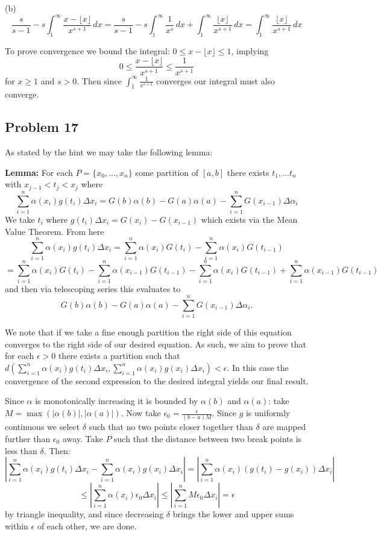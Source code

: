 \documentclass{amsart}
\begin{document}
(b) \[\frac{s}{s-1}-s\int_1^\infty \frac{x-\lfloor x\rfloor}{x^{s+1}}\,dx=\frac{s}{s-1}-s\int_1^\infty\frac{1}{x^s}\,dx+\int_1^\infty\frac{\lfloor x \rfloor}{x^{s+1}}\,dx=\int_1^\infty\frac{\lfloor x \rfloor}{x^{s+1}}\,dx\]

To prove convergence we bound the integral: $0\leq x-\lfloor x\rfloor\leq 1$, implying \[0\leq\frac{x-\lfloor x\rfloor}{x^{s+1}}\leq \frac{1}{x^{s+1}}\] for $x\geq 1$ and $s>0$. Then since $\int_1^\infty \frac{1}{x^{s+1}}$ converges our integral must also converge.

\subsection*{Problem 17}
As stated by the hint we may take the following lemma:

\medskip \noindent \textbf{Lemma:} For each $P=\{x_0,\dots,x_n\}$ some partition of $[a,b]$ there exists $t_1,\dots t_n$ with $x_{j-1}<t_j<x_j$ where \[\sum_{i=1}^n\alpha(x_i)g(t_i)\Delta x_i=G(b)\alpha(b)-G(a)\alpha(a)-\sum_{i=1}^nG(x_{i-1})\Delta \alpha_i\]
We take $t_i$ where $g(t_i)\Delta x_i = G(x_i)-G(x_{i-1})$ which exists via the Mean Value Theorem. From here \[\sum_{i=1}^n\alpha(x_i)g(t_i)\Delta x_i= \sum_{i=1}^n\alpha(x_i)G(t_i)- \sum_{i=1}^n\alpha(x_i)G(t_{i-1})\]
\[= \sum_{i=1}^n\alpha(x_i)G(t_i)-  \sum_{i=1}^n\alpha(x_{i-1})G(t_{i-1})-\sum_{i=1}^n\alpha(x_i)G(t_{i-1})+ \sum_{i=1}^n\alpha(x_{i-1})G(t_{i-1})\]
and then via telescoping series this evaluates to 
\[G(b)\alpha(b)-G(a)\alpha(a)-\sum_{i=1}^nG(x_{i-1})\Delta \alpha_i.\]

\medskip \noindent We note that if we take a fine enough partition the right side of this equation converges to the right side of our desired equation. As such, we aim to prove that for each $\epsilon>0$ there exists a partition such that $d(\sum_{i=1}^n\alpha(x_i)g(t_i)\Delta x_i,\sum_{i=1}^n\alpha(x_i)g(x_i)\Delta x_i) < \epsilon$. In this case the convergence of the second expression to the desired integral yields our final result.

\medskip \noindent Since $\alpha$ is monotonically increasing it is bounded by $\alpha(b)$ and $\alpha(a)$: take $M=\max(|\alpha(b)|,|\alpha(a)|)$. Now take $\epsilon_0 = \frac{\epsilon}{(b-a)M}$. Since $g$ is uniformly continuous we select $\delta$ such that no two points closer together than $\delta$ are mapped further than $\epsilon_0$ away. Take $P$ such that the distance between two break points is less than $\delta$. Then:
\[\left|\sum_{i=1}^n\alpha(x_i)g(t_i)\Delta x_i-\sum_{i=1}^n\alpha(x_i)g(x_i)\Delta x_i\right| = \left|\sum_{i=1}^n\alpha(x_i)(g(t_i)-g(x_i))\Delta x_i\right|\]\[\leq  \left|\sum_{i=1}^n\alpha(x_i)\epsilon_0\Delta x_i\right|\leq  \left|\sum_{i=1}^nM\epsilon_0\Delta x_i\right|=\epsilon\] by triangle inequality, and since decreasing $\delta$ brings the lower and upper sums within $\epsilon$ of each other, we are done.
\end{document}
